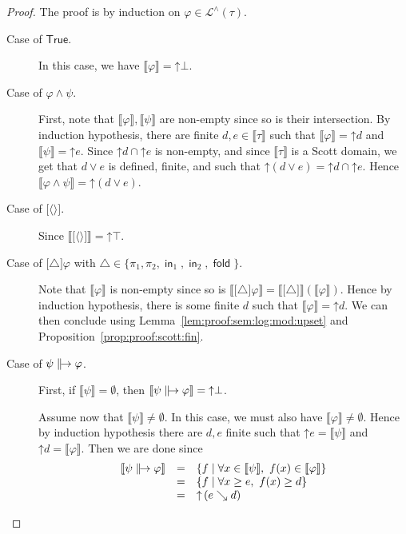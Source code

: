 \documentclass[%
  a4paper,
  UKenglish,
  cleveref,
  autoref,
  thm-restate,
  numberwithinsect,
]{lipics-v2021}
\newcommand\pair[1]{{\langle #1\rangle}}
\newcommand\up{\mathord{\uparrow}}
\newcommand\I[1]{\llbracket #1 \rrbracket} %
\newcommand\temp[1]{\mathsf{#1}}
\newcommand\True{\temp{True}}
\newcommand\term[1]{\mathsf{#1}}
\newcommand\inj{\mathop{\term{in}}}
\newcommand\fold{\mathop{\term{fold}}}
\newcommand\defrealto{\mathrel\parallel\joinrel\to}
\newcommand\realto{\mathrel{\defrealto}}
\newcommand\PT{\tau}		%
\newcommand\step{\searrow}
\newcommand\Lang{\mathcal{L}}
\newcommand\form[1]{\lbrack #1 \rbrack}
\newcommand\modgen{\mathord{\triangle}}	%
\begin{document}
\begin{proof}
The proof is by induction on $\varphi \in \Lang^\land(\PT)$.
\begin{description}
\item[Case of $\True$.]
In this case, we have $\I\varphi = \up \bot$.

\item[Case of $\varphi \land \psi$.]
First, note that $\I\varphi, \I\psi$ are non-empty since so is their intersection.
By induction hypothesis, there are finite $d,e \in \I\PT$
such that $\I\varphi = \up d$ and $\I\psi = \up e$.
Since $\up d \cap \up e$ is non-empty, and since $\I\PT$ is a Scott domain,
we get that $d \vee e$ is defined, finite, and such that
$\up(d\vee e) = \up d \cap \up e$.
Hence $\I{\varphi \land \psi} = \up(d \vee e)$.

\item[Case of $\form{\pair{}}$.]
Since $\I{\form{\pair{}}} = \up\top$.

\item[Case of $\form{\modgen}\varphi$
with $\modgen \in \{\pi_1, \pi_2, \inj_1, \inj_2, \fold\}$.]
Note that $\I\varphi$ is non-empty since so is
$\I{\form\modgen\varphi} = \I{\form\modgen}(\I\varphi)$.
Hence by induction hypothesis, there is some finite $d$
such that $\I\varphi = \up d$.
We can then conclude using Lemma~\ref{lem:proof:sem:log:mod:upset}
and Proposition~\ref{prop:proof:scott:fin}.

\item[Case of $\psi \realto \varphi$.]
First, if $\I\psi = \emptyset$,
then $\I{\psi \realto \varphi} = \up \bot$.

Assume now that $\I\psi \neq \emptyset$.
In this case, we must also have $\I\varphi \neq \emptyset$.
Hence by induction hypothesis there are $d,e$ finite
such that
$\up e = \I\psi$ and $\up d = \I\varphi$.
Then we are done since
\[
\begin{array}{l l l}
  \I{\psi \realto \varphi}
& =
& \left\{ f \mid \forall x \in \I\psi,~ f(x) \in \I\varphi\right\}
\\
%
& =
& \left\{ f \mid \forall x \geq e,~ f(x) \geq d\right\}
\\
%
& =
& \up \left(e \step d \right)
\end{array}
\]
\qedhere
\end{description}
\end{proof}
\end{document}
